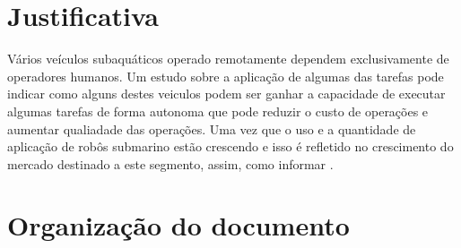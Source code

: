 %
%
%
%
%
%


\section{Justificativa}
\label{sec:justi}

Vários veículos subaquáticos operado remotamente dependem exclusivamente de operadores humanos. Um estudo sobre a aplicação de algumas das tarefas pode indicar como alguns destes veiculos podem ser ganhar a capacidade de executar algumas tarefas de forma autonoma que pode reduzir o custo de operações e aumentar qualiadade das operações. Uma vez que o uso e a quantidade de aplicação de robôs submarino estão crescendo e isso é refletido no crescimento do mercado destinado a este segmento, assim, como informar \cite{yahoo_finaces}.




\section{Organização do documento}
\label{section:organizacao}

